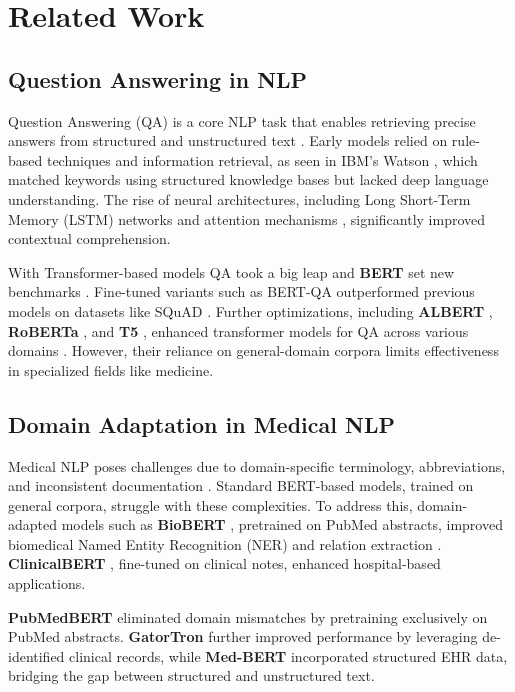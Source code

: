 \section{Related Work}
\subsection{Question Answering in NLP}
Question Answering (QA) is a core NLP task that enables retrieving precise answers from structured and unstructured text \cite{jurafsky2023speech, agarwal2021evaluate}. Early models relied on rule-based techniques and information retrieval, as seen in IBM's Watson \cite{ferrucci2010building}, which matched keywords using structured knowledge bases but lacked deep language understanding. The rise of neural architectures, including Long Short-Term Memory (LSTM) networks \cite{hochreiter1997long} and attention mechanisms \cite{vaswani2017attention}, significantly improved contextual comprehension.

With Transformer-based models QA took a big leap and \textbf{BERT} \cite{devlin2019bert} set new benchmarks \cite{agarwal2024mvtamperbench}. Fine-tuned variants such as BERT-QA outperformed previous models on datasets like SQuAD \cite{rajpurkar2018know}. Further optimizations, including \textbf{ALBERT} \cite{lan2020albert}, \textbf{RoBERTa} \cite{liu2019roberta}, and \textbf{T5} \cite{raffel2020exploring}, enhanced transformer models for QA across various domains \cite{pattnayak2024survey}. However, their reliance on general-domain corpora limits effectiveness in specialized fields like medicine.


\subsection{Domain Adaptation in Medical NLP}
Medical NLP poses challenges due to domain-specific terminology, abbreviations, and inconsistent documentation \cite{agarwal-etal-2025-fs}. Standard BERT-based models, trained on general corpora, struggle with these complexities. To address this, domain-adapted models such as \textbf{BioBERT} \cite{lee2020biobert}, pretrained on PubMed abstracts, improved biomedical Named Entity Recognition (NER) and relation extraction \cite{Pattnayak2017AutoSales}. \textbf{ClinicalBERT} \cite{alsentzer2019clinicalbert}, fine-tuned on clinical notes, enhanced hospital-based applications.

\textbf{PubMedBERT} \cite{gu2021domain} eliminated domain mismatches by pretraining exclusively on PubMed abstracts. \textbf{GatorTron} \cite{yang2022large} further improved performance by leveraging de-identified clinical records, while \textbf{Med-BERT} \cite{huang2021clinical} incorporated structured EHR data, bridging the gap between structured and unstructured text.

